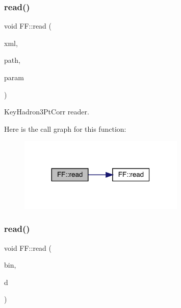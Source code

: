 \subsubsection{\texorpdfstring{read()}{read()}\hspace{0.1cm}{\footnotesize\ttfamily [10/14]}}
{\footnotesize\ttfamily void F\+F\+::read (\begin{DoxyParamCaption}\item[{X\+M\+L\+Reader \&}]{xml,  }\item[{const std\+::string \&}]{path,  }\item[{\mbox{\hyperlink{structFF_1_1KeyHadron3PtCorr__t}{Key\+Hadron3\+Pt\+Corr\+\_\+t}} \&}]{param }\end{DoxyParamCaption})}



Key\+Hadron3\+Pt\+Corr reader. 

Here is the call graph for this function\+:
\nopagebreak
\begin{figure}[H]
\begin{center}
\leavevmode
\includegraphics[width=224pt]{d5/da6/namespaceFF_a457d1bd921b678eadc34fb2dbfcbdb32_cgraph}
\end{center}
\end{figure}
\mbox{\label{namespaceFF_a90d854af01e30d52191dff4341fcd4ad}} 
\subsubsection{\texorpdfstring{read()}{read()}\hspace{0.1cm}{\footnotesize\ttfamily [11/14]}}
{\footnotesize\ttfamily void F\+F\+::read (\begin{DoxyParamCaption}\item[{\mbox{\hyperlink{classADATIO_1_1BinaryReader}{Binary\+Reader}} \&}]{bin,  }\item[{\mbox{\hyperlink{structFF_1_1DiscoKeyOperator__t}{Disco\+Key\+Operator\+\_\+t}} \&}]{d }\end{DoxyParamCaption})}



